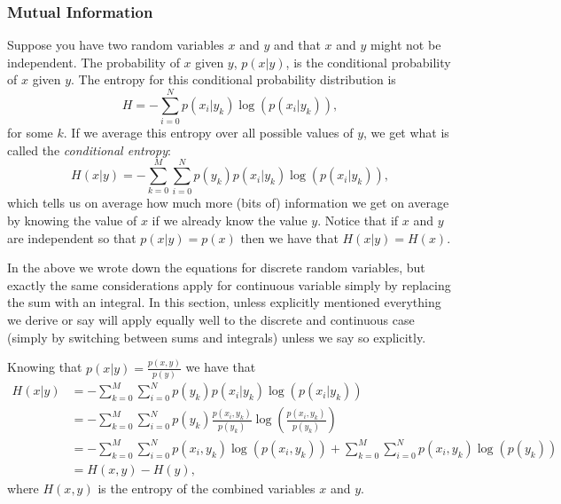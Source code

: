 \documentclass[]{article}
\begin{document}
\subsubsection{Mutual Information}
\label{mutual-information}

Suppose you have two random variables $x$ and $y$ and that $x$ and $y$ might not be independent. The probability of $x$ given $y$, $p(x|y)$, is the conditional probability of $x$ given $y$. The entropy for this conditional probability distribution is 
\begin{equation}
\label{eq:condHk}
H =  -\sum_{i=0}^N p(x_i|y_k) \log(p(x_i|y_k)) ,
\end{equation}
for some $k$. If we average this entropy over all possible values of $y$, we get what is called the \textit{conditional entropy}:
\begin{equation}
\label{eq:condH}
H(x|y) =  -\sum_{k=0}^M\sum_{i=0}^N p(y_k) p(x_i|y_k) \log(p(x_i|y_k)) ,
\end{equation}
which tells us on average how much more (bits of) information we get on average by knowing the value of $x$ if we already know the value $y$. Notice that if $x$ and $y$ are independent so that $p(x|y) = p(x)$ then we have that $H(x|y) = H(x)$. 

In the above we wrote down the equations for discrete random variables, but exactly the same considerations apply for continuous variable simply by replacing the sum with an integral. In this section, unless explicitly mentioned everything we derive or say will apply equally well to the discrete and continuous case (simply by switching between sums and integrals) unless we say so explicitly. 

Knowing that $p(x|y) = \frac{p(x,y)}{p(y)}$ we have that
\begin{align}
\label{id:condH}
H(x|y) & =  -\sum_{k=0}^M\sum_{i=0}^N p(y_k) p(x_i|y_k) \log(p(x_i|y_k)) \\
& = -\sum_{k=0}^M\sum_{i=0}^N p(y_k) \frac{p(x_i,y_k)}{p(y_k)} \log(\frac{p(x_i,y_k)}{p(y_k)}) \\
\label{interHcond}
&  = -\sum_{k=0}^M\sum_{i=0}^N p(x_i,y_k)\log(p(x_i,y_k)) + \sum_{k=0}^M\sum_{i=0}^N p(x_i,y_k)\log(p(y_k)) \\
& = H(x,y) - H(y) ,
\end{align}
where $H(x,y)$ is the entropy of the combined variables $x$ and $y$. 
\end{document}
